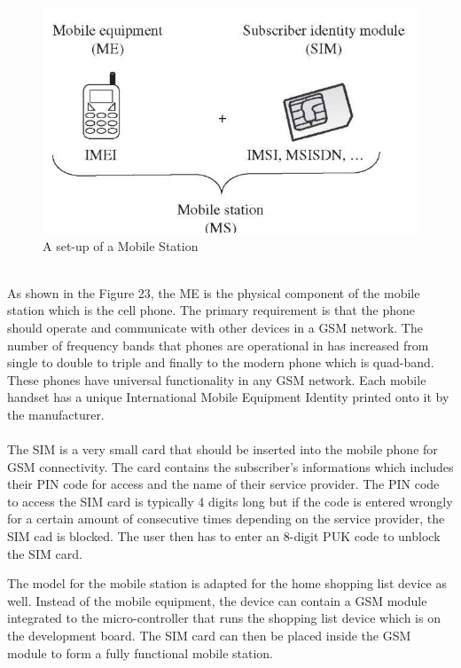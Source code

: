 \begin{figure}[h]
	\centering
	\includegraphics[scale=0.8]{22}
	\caption{A set-up of a Mobile Station}
\end{figure}
\\
As shown in the Figure 23, the ME is the physical component of the mobile station which is the cell phone. The primary requirement is that the phone should operate and communicate with other devices in a GSM network. The number of frequency bands that phones are operational in has increased from single to double to triple and finally to the modern phone which is quad-band. These phones have universal functionality in any GSM network. Each mobile handset has a unique International Mobile Equipment Identity printed onto it by the manufacturer.\\\\
The SIM is a very small card that should be inserted into the mobile phone for GSM connectivity. The card contains the subscriber's informations which includes their PIN code for access and the name of their service provider. The PIN code to access the SIM card is typically 4 digits long but if the code is entered wrongly for a certain amount of consecutive times depending on the service provider, the SIM cad is blocked. The user then has to enter an 8-digit PUK code to unblock the SIM card.

The model for the mobile station is adapted for the home shopping list device as well. Instead of the mobile equipment, the device can contain a GSM module integrated to the micro-controller that runs the shopping list device which is on the development board. The SIM card can then be placed inside the GSM module to form a fully functional mobile station.

